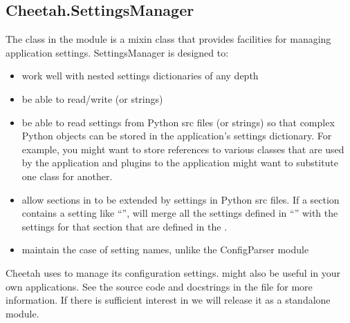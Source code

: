 \subsection{Cheetah.SettingsManager}
\label{libraries.SettingsManager}

The  class in the  module is
a mixin class that provides facilities for managing application settings.  
SettingsManager is designed to:
\begin{itemize}
\item work well with nested settings dictionaries of any depth
\item be able to read/write  (or strings)
\item be able to read settings from Python src files (or strings) so that
     complex Python objects can be stored in the application's settings
     dictionary.  For example, you might want to store references to various
     classes that are used by the application and plugins to the application
     might want to substitute one class for another.
\item allow sections in  to be extended by settings in
     Python src files.  If a section contains a setting like
     ``'',  will merge
     all the settings defined in ``'' with the settings for
     that section that are defined in the .
\item maintain the case of setting names, unlike the ConfigParser module
\end{itemize}

Cheetah uses  to manage its configuration settings.
 might also be useful in your own applications. See the
source code and docstrings in the file  for more
information. If there is sufficient interest in  we will
release it as a standalone module.

